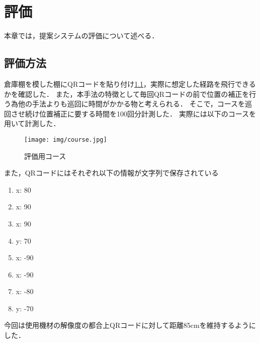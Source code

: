 \chapter{評価}
\label{evaluation}
本章では，提案システムの評価について述べる．

\section{評価方法}
倉庫棚を模した棚にQRコードを貼り付け\ref{course}，実際に想定した経路を飛行できるかを確認した．
また，本手法の特徴として毎回QRコードの前で位置の補正を行う為他の手法よりも巡回に時間がかかる物と考えられる．
そこで，コースを巡回させ続け位置補正に要する時間を100回分計測した．
実際には以下のコースを用いて計測した．


\begin{figure}[htbp]
  \begin{center}
    \texttt{[image: img/course.jpg]}
    \caption{評価用コース}
    \label{course}
  \end{center}
\end{figure}

また，QRコードにはそれぞれ以下の情報が文字列で保存されている
\begin{enumerate}
    \item {x: 80}
    \item {x: 90}
    \item {x: 90}
    \item {y: 70}
    \item {x: -90}
    \item {x: -90}
    \item {x: -80}
    \item {y: -70}
\end{enumerate}

今回は使用機材の解像度の都合上QRコードに対して距離85cmを維持するようにした．



